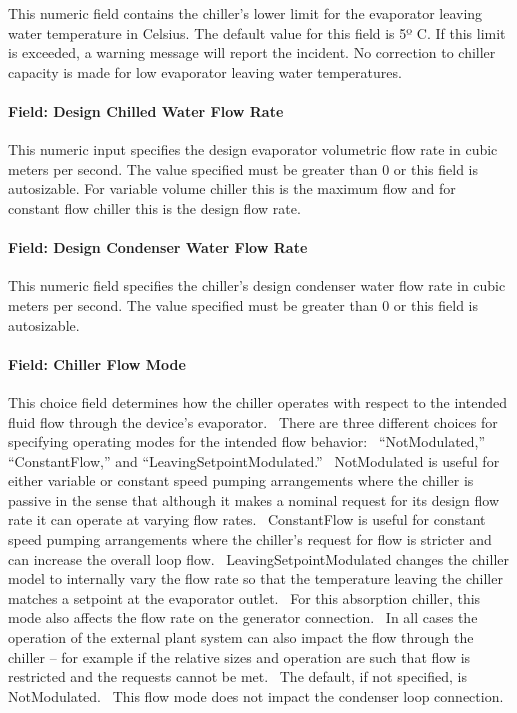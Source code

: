 This numeric field contains the chiller's lower limit for the evaporator leaving water temperature in Celsius. The default value for this field is 5º C. If this limit is exceeded, a warning message will report the incident. No correction to chiller capacity is made for low evaporator leaving water temperatures.

\paragraph{Field: Design Chilled Water Flow Rate}\label{field-design-chilled-water-flow-rate-1}

This numeric input specifies the design evaporator volumetric flow rate in cubic meters per second. The value specified must be greater than 0 or this field is autosizable. For variable volume chiller this is the maximum flow and for constant flow chiller this is the design flow rate.

\paragraph{Field: Design Condenser Water Flow Rate}\label{field-design-condenser-water-flow-rate-1}

This numeric field specifies the chiller's design condenser water flow rate in cubic meters per second. The value specified must be greater than 0 or this field is autosizable.

\paragraph{Field: Chiller Flow Mode}\label{field-chiller-flow-mode-1}

This choice field determines how the chiller operates with respect to the intended fluid flow through the device's evaporator.~ There are three different choices for specifying operating modes for the intended flow behavior:~ ``NotModulated,'' ``ConstantFlow,'' and ``LeavingSetpointModulated.''~ NotModulated is useful for either variable or constant speed pumping arrangements where the chiller is passive in the sense that although it makes a nominal request for its design flow rate it can operate at varying flow rates.~ ConstantFlow is useful for constant speed pumping arrangements where the chiller's request for flow is stricter and can increase the overall loop flow.~ LeavingSetpointModulated changes the chiller model to internally vary the flow rate so that the temperature leaving the chiller matches a setpoint at the evaporator outlet.~ For this absorption chiller, this mode also affects the flow rate on the generator connection.~ In all cases the operation of the external plant system can also impact the flow through the chiller -- for example if the relative sizes and operation are such that flow is restricted and the requests cannot be met.~ The default, if not specified, is NotModulated.~ This flow mode does not impact the condenser loop connection.

